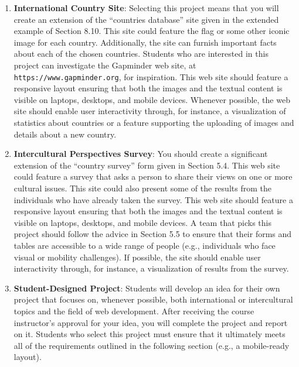 \documentclass[11pt]{article}
\newcommand{\url}[1]{\lstinline{#1}}
\begin{document}
\begin{enumerate}
  \item {\bf International Country Site}: Selecting this project means that you
    will create an extension of the ``countries database'' site given in the
    extended example of Section 8.10. This site could feature the flag or some
    other iconic image for each country. Additionally, the site can furnish
    important facts about each of the chosen countries. Students who are
    interested in this project can investigate the Gapminder web site, at
    \url{https://www.gapminder.org}, for inspiration. This web site should
    feature a responsive layout ensuring that both the images and the textual
    content is visible on laptops, desktops, and mobile devices. Whenever
    possible, the web site should enable user interactivity through, for
    instance, a visualization of statistics about countries or a feature
    supporting the uploading of images and details about a new country.

  \item {\bf Intercultural Perspectives Survey}: You should create a
    significant extension of the ``country survey'' form given in Section 5.4.
    This web site could feature a survey that asks a person to share their views
    on one or more cultural issues. This site could also present some of the
    results from the individuals who have already taken the survey. This web
    site should feature a responsive layout ensuring that both the images and
    the textual content is visible on laptops, desktops, and mobile devices. A
    team that picks this project should follow the advice in Section 5.5 to
    ensure that their forms and tables are accessible to a wide range of people
    (e.g., individuals who face visual or mobility challenges). If possible, the
    site should enable user interactivity through, for instance, a visualization
    of results from the survey.

  \item {\bf Student-Designed Project}: Students will develop an idea for their
    own project that focuses on, whenever possible, both international or
    intercultural topics and the field of web development. After receiving the
    course instructor's approval for your idea, you will complete the project
    and report on it.
    Students who select this project must ensure that it ultimately meets all of
    the requirements outlined in the following section (e.g., a mobile-ready
    layout).

\end{enumerate}
\end{document}
